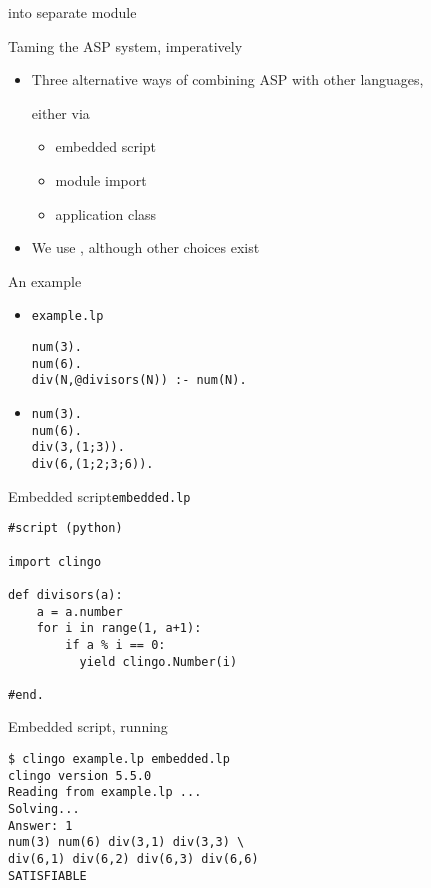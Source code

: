 \REFACTORED into separate module
\begin{frame}{Taming the ASP system, imperatively}
  \bigskip
  \begin{itemize}
  \item Three alternative ways of combining ASP with other languages,

    either via
    \begin{itemize}\normalsize
    \item embedded script
    \item module import
    \item application class
    \end{itemize}
    \bigskip
  \item We use \python, although other choices exist
  \end{itemize}
\end{frame}
\begin{frame}[fragile]{An example}
  \bigskip
  \begin{itemize}
  \item<1->   \texttt{example.lp}
\begin{lstlisting}
num(3).
num(6).
div(N,@divisors(N)) :- num(N).
\end{lstlisting}
  \bigskip
  \item<2-> 
\begin{lstlisting}
num(3).
num(6).
div(3,(1;3)).
div(6,(1;2;3;6)).
\end{lstlisting}
  \end{itemize}
\end{frame}
\begin{frame}[fragile]{Embedded script}{\texttt{embedded.lp}}
  \bigskip
\begin{lstlisting}
#script (python)

import clingo

def divisors(a):
    a = a.number
    for i in range(1, a+1):
        if a % i == 0:
          yield clingo.Number(i)

#end.
\end{lstlisting}
\end{frame}
\begin{frame}[fragile]{Embedded script, running}
  \bigskip
\begin{lstlisting}
$ clingo example.lp embedded.lp
clingo version 5.5.0
Reading from example.lp ...
Solving...
Answer: 1
num(3) num(6) div(3,1) div(3,3) \
div(6,1) div(6,2) div(6,3) div(6,6)
SATISFIABLE
\end{lstlisting}
\end{frame}
